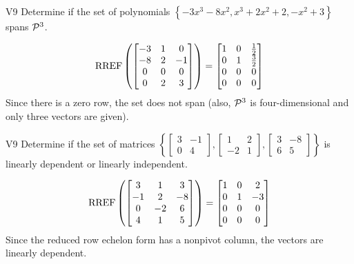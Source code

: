 \begin{problem}{V9}
Determine if the set of polynomials \(\left\{ -3x^3-8x^2, x^3+2x^2+2, -x^2+3\right\}\) spans \(\P^3\).
\end{problem}
\begin{solution}
\[\RREF\left( \begin{bmatrix}-3 & 1 & 0 \\ -8 & 2 & -1 \\ 0 & 0 & 0 \\ 0 & 2 & 3 \end{bmatrix}\right) = \begin{bmatrix} 1 & 0 & \frac{1}{2} \\ 0 & 1 & \frac{3}{2} \\ 0 & 0 & 0 \\ 0 & 0 & 0 \end{bmatrix}\]
Since there is a zero row, the set does not span (also, \(\P^3\) is
four-dimensional and only three vectors are given).
\end{solution}

\begin{problem}{V9}
Determine if the set of matrices \(\left\{\begin{bmatrix} 3 & -1 \\ 0 & 4 \end{bmatrix}, \begin{bmatrix} 1  & 2 \\ -2 & 1 \end{bmatrix}, \begin{bmatrix} 3 & -8 \\ 6 & 5 \end{bmatrix} \right\}\)  is linearly dependent or linearly independent.
\end{problem}
\begin{solution}
\[\RREF\left(\begin{bmatrix} 3 & 1 & 3 \\ -1 & 2 & -8 \\ 0 & -2 & 6 \\ 4 & 1 & 5 \end{bmatrix} \right) = \begin{bmatrix} 1 & 0 & 2 \\ 0 & 1 & -3 \\ 0 & 0 & 0 \\ 0 & 0 & 0 \end{bmatrix}\]
Since the reduced row echelon form has a nonpivot column, the vectors are linearly dependent.
\end{solution}

